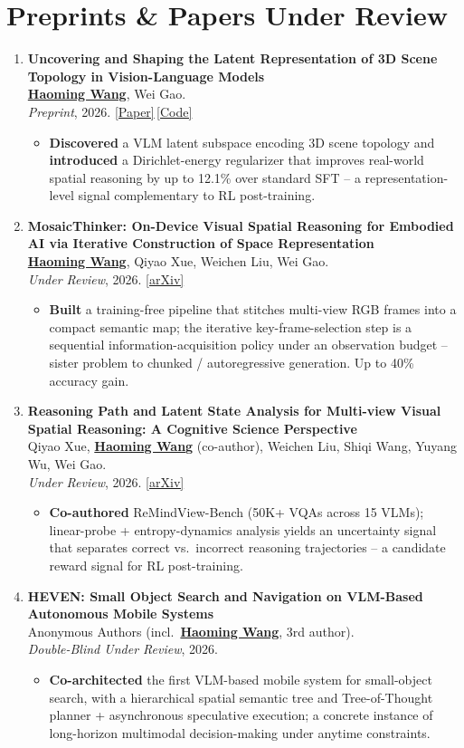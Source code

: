 \documentclass[11pt, letterpaper]{article}
\newenvironment{publist}{
  \begin{enumerate}[leftmargin=1.7em, itemsep=4pt, parsep=0pt, topsep=2pt, label=\arabic*.]
}{\end{enumerate}}
\newcommand{\impactbullet}[1]{%
  \par\vspace{1pt}%
  \begin{itemize}[leftmargin=1.2em, topsep=0pt, itemsep=0pt, parsep=0pt, partopsep=0pt]
    \item #1
  \end{itemize}}
\newcommand{\me}{\underline{\textbf{Haoming Wang}}}
\newcommand{\meco}{\underline{\textbf{Haoming Wang}} (co-author)}
\newcommand{\meanon}{\underline{\textbf{Haoming Wang}}}
\begin{document}
\section{Preprints \& Papers Under Review}

\begin{publist}
\item \textbf{Uncovering and Shaping the Latent Representation of 3D Scene Topology in Vision-Language Models}\\
\me, Wei Gao.\\
\textit{Preprint}, 2026. \href{https://haomingwang645.github.io/pdfs/arxiv26_vlm_latent_shaping.pdf}{[Paper]}\,\href{https://github.com/pittisl/vlm-latent-shaping}{[Code]}
\impactbullet{\textbf{Discovered} a VLM latent subspace encoding 3D scene topology and \textbf{introduced} a Dirichlet-energy regularizer that improves real-world spatial reasoning by up to 12.1\% over standard SFT -- a representation-level signal complementary to RL post-training.}

\item \textbf{MosaicThinker: On-Device Visual Spatial Reasoning for Embodied AI via Iterative Construction of Space Representation}\\
\me, Qiyao Xue, Weichen Liu, Wei Gao.\\
\textit{Under Review}, 2026. \href{https://www.arxiv.org/abs/2602.07082}{[arXiv]}
\impactbullet{\textbf{Built} a training-free pipeline that stitches multi-view RGB frames into a compact semantic map; the iterative key-frame-selection step is a sequential information-acquisition policy under an observation budget -- sister problem to chunked / autoregressive generation. Up to 40\% accuracy gain.}

\item \textbf{Reasoning Path and Latent State Analysis for Multi-view Visual Spatial Reasoning: A Cognitive Science Perspective}\\
Qiyao Xue, \meco, Weichen Liu, Shiqi Wang, Yuyang Wu, Wei Gao.\\
\textit{Under Review}, 2026. \href{https://arxiv.org/abs/2512.02340}{[arXiv]}
\impactbullet{\textbf{Co-authored} ReMindView-Bench (50K+ VQAs across 15 VLMs); linear-probe + entropy-dynamics analysis yields an uncertainty signal that separates correct vs.\ incorrect reasoning trajectories -- a candidate reward signal for RL post-training.}

\item \textbf{HEVEN: Small Object Search and Navigation on VLM-Based Autonomous Mobile Systems}\\
Anonymous Authors (incl.\ \meanon, 3rd author).\\
\textit{Double-Blind Under Review}, 2026.
\impactbullet{\textbf{Co-architected} the first VLM-based mobile system for small-object search, with a hierarchical spatial semantic tree and Tree-of-Thought planner + asynchronous speculative execution; a concrete instance of long-horizon multimodal decision-making under anytime constraints.}


\end{publist}
\end{document}
